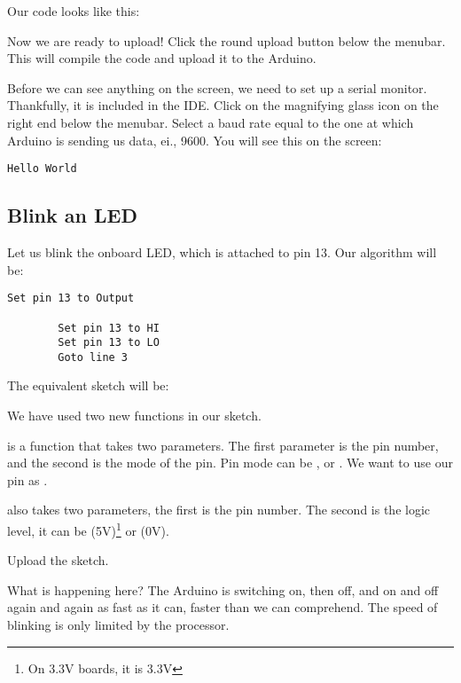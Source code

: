 \documentclass{article}
\begin{document}
		Our code looks like this:

		

		Now we are ready to upload! Click the round upload button below the menubar. This will compile the code and upload it to the Arduino.

		Before we can see anything on the screen, we need to set up a serial monitor. Thankfully, it is included in the IDE. Click on the magnifying glass icon on the right end below the menubar. Select a baud rate equal to the one at which Arduino is sending us data, ei., 9600. You will see this on the screen:

		\begin{lstlisting}[gobble=8]
		Hello World
		\end{lstlisting}

	\subsection{Blink an LED}

		Let us blink the onboard LED, which is attached to pin 13. Our algorithm will be:

		\begin{lstlisting}[gobble=8]
		Set pin 13 to Output

		Set pin 13 to HI
		Set pin 13 to LO
		Goto line 3
		\end{lstlisting}

		The equivalent sketch will be:

		

		We have used two new functions in our sketch.

		 is a function that takes two parameters. The first parameter is the pin number, and the second is the mode of the pin. Pin mode can be  ,  or . We want to use our pin as .

		 also takes two parameters, the first is the pin number. The second is the logic level, it can be  (5V)\footnote{On 3.3V boards, it is 3.3V} or  (0V).

		Upload the sketch.

		What is happening here? The Arduino is switching on, then off, and on and off again and again as fast as it can, faster than we can comprehend. The speed of blinking is only limited by the processor.
\end{document}
